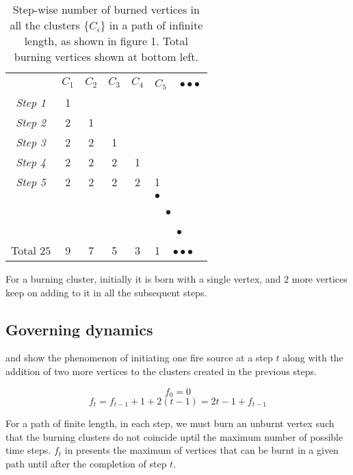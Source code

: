 \begin{table}
    \centering
    \begin{tabular}{c|c|c|c|c|l}
          & $C_1$ & $C_2$ & $C_3$ & $C_4$ & $C_5$ $\ \ \ \bullet \bullet \bullet$\\
        \textit{Step 1} & 1 &   &   &   &  \\
        \textit{Step 2} & 2 & 1 &   &   &  \\
        \textit{Step 3} & 2 & 2 & 1 &   &  \\
        \textit{Step 4} & 2 & 2 & 2 & 1 &  \\
        \textit{Step 5} & 2 & 2 & 2 & 2 & 1\\
          &   &   &   &   & $\bullet$\\
          &   &   &   &   & \ \ $\bullet$\\
          &   &   &   &   & \ \ \ \ $\bullet$\\
         Total $25$ & 9 & 7 & 5 & 3 & 1 $\ \ \ \bullet \bullet \bullet$\\
    \end{tabular}
    \caption{Step-wise number of burned vertices in all the clusters $\{C_i\}$ in a path of infinite length, as shown in figure 1. Total burning vertices shown at bottom left.}
    \label{table:burn-path-inf}
\end{table}

For a burning cluster, initially it is born with a single vertex, and $2$ more vertices keep on adding to it in all the subsequent steps.

\subsection{Governing dynamics}

 and  show the phenomenon of initiating one fire source at a step $t$ along with the addition of two more vertices to the clusters created in the previous steps.

\begin{equation}\label{equation:burn-path-inf-1}
f_0 = 0
\end{equation}
\begin{equation}\label{equation:burn-path-inf-2}
f_t = f_{t-1} + 1 + 2(t - 1) = 2t - 1 + f_{t-1}
\end{equation}

For a path of finite length, in each step, we must burn an unburnt vertex such that the burning clusters do not coincide uptil the maximum number of possible time steps. $f_t$ in  presents the maximum of vertices that can be burnt in a given path until after the completion of step $t$.

